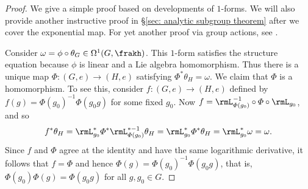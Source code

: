 \begin{proof}
    We give a simple proof based on developments of $1$-forms. We will also provide another instructive proof in \S\ref{sec: analytic subgroup theorem} after we cover the exponential map. For yet another proof via group actions, see \cite[Thm.~20.19]{Lee}.

    Consider $\omega=\phi\circ \theta_G\in \Omega^1(G,\frakh)$. This $1$-form satisfies the structure equation because $\phi$ is linear and a Lie algebra homomorphism. Thus there is a unique map $\varPhi:(G,e)\to (H,e)$ satisfying $\varPhi^\ast \theta_H=\omega$. We claim that $\varPhi$ is a homomorphism. To see this, consider $f:(G,e)\to (H,e)$ defined by $f(g)=\varPhi(g_0)^{-1}\varPhi(g_0g)$ for some fixed $g_0$. Now $f=\rmL_{\varPhi(g_0)}^{-1}\circ\varPhi\circ \rmL_{g_0}$, and so
    \[f^\ast\theta_H=\rmL_{g_0}^\ast \varPhi^\ast \rmL_{\varPhi(g_0)}^{\ast-1}\theta_H=\rmL_{g_0}^\ast \varPhi^\ast\theta_H=\rmL_{g_0}^\ast \omega=\omega.\]
    Since $f$ and $\varPhi$ agree at the identity and have the same logarithmic derivative, it follows that $f=\varPhi$ and hence $\varPhi(g)=\varPhi(g_0)^{-1}\varPhi(g_0g)$, that is, $\varPhi(g_0)\varPhi(g)=\varPhi(g_0g)$ for all $g,g_0\in G$.


\end{proof}
